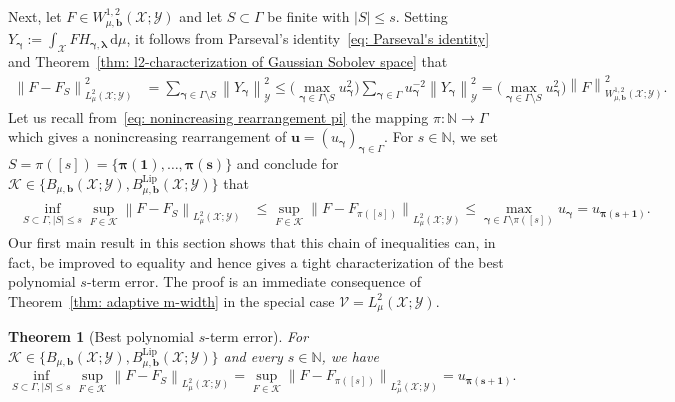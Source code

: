 \documentclass[namedate,webpdf]{ima-authoring-template-blank}
\newcommand*{\Lip}{\mathrm{Lip}}  %
\def\D{\,\mathrm{d}}
\newcommand*{\nm}[1]{{\left\|#1\right \|}}
\newcommand*{\nmd}[1]{{\|#1\|}}    %
\newcommand{\abs}[1]{\left|#1\right|}
\newcounter{counter}
\numberwithin{counter}{section}
\numberwithin{equation}{section}
\theoremstyle{plain}
\newtheorem{theorem}[counter]{Theorem}
\theoremstyle{definition}
\newcommand*{\cK}{\mathcal{K}}
\newcommand*{\cV}{\mathcal{V}}
\newcommand*{\cX}{\mathcal{X}}
\newcommand*{\cY}{\mathcal{Y}}
\newcommand*{\bbN}{\mathbb{N}}
\theoremstyle{thmstyletwo}
\begin{document}
Next, let \(F \in W_{\mu, \bm{b}}^{1, 2}(\cX; \cY)\) and let \(S \subset \Gamma\) be finite with \(\abs{S} \leq s\). Setting \(Y_{\bm{\gamma}} := \int_{\cX} F H_{\bm{\gamma}, \bm{\lambda}} \D \mu\), it follows from Parseval's identity~\eqref{eq: Parseval's identity} and Theorem~\ref{thm: l2-characterization of Gaussian Sobolev space} that
\begin{align*}
    \nm{F - F_S}_{L_{\mu}^2(\cX; \cY)}^2 
    &= \sum_{\bm{\gamma} \in \Gamma \setminus S} \nm{Y_{\bm{\gamma}}}_{\cY}^2 
    \leq \big( \max_{\bm{\gamma} \in \Gamma \setminus S} u_{\bm{\gamma}}^2 \big) \sum_{\bm{\gamma} \in \Gamma} u_{\bm{\gamma}}^{-2} \nm{Y_{\bm{\gamma}}}_{\cY}^2  
    = \big( \max_{\bm{\gamma} \in \Gamma \setminus S} u_{\bm{\gamma}}^2 \big) \nm{F}_{W_{\mu, \bm{b}}^{1, 2}(\cX; \cY)}^2.
\end{align*}
Let us recall from~\eqref{eq: nonincreasing rearrangement pi} the mapping \(\pi: \bbN \to \Gamma\) which gives a nonincreasing rearrangement of \(\bm{u} = (u_{\bm{\gamma}})_{\bm{\gamma} \in \Gamma}\). For $s \in \bbN$, we set \(S = \pi([s]) = \{\bm{\pi(1)}, \dots, \bm{\pi(s)}\}\) and conclude for \(\cK \in \{ B_{\mu, \bm{b}}(\cX; \cY), B_{\mu, \bm{b}}^{\Lip}(\cX; \cY) \}\) that
\begin{align}
\label{eq: s-term: approximation error <= u_pi(s+1)}
\begin{split}
    \inf_{S \subset \Gamma, \abs{S} \leq s} \sup_{F \in \cK} \nm{F - F_S}_{L_{\mu}^2(\cX; \cY)}
    &\leq \sup_{F \in \cK} \nmd{F - F_{\pi([s])}}_{L_{\mu}^2(\cX; \cY)} 
    \leq \max_{\bm{\gamma} \in \Gamma \setminus \pi([s])} u_{\bm{\gamma}} 
    = u_{\bm{\pi(s + 1)}}.
\end{split}
\end{align}
Our first main result in this section shows that this chain of inequalities can, in fact, be improved to equality and hence gives a tight characterization of the best polynomial \(s\)-term error.
The proof is an immediate consequence of Theorem~\ref{thm: adaptive m-width} in the special case \(\cV = L_{\mu}^2(\cX; \cY)\).

\begin{theorem}[Best polynomial \(s\)-term error]
\label{thm: s-term: best s-term approximation error}
    For \(\cK \in \{ B_{\mu, \bm{b}}(\cX; \cY), B_{\mu, \bm{b}}^{\Lip}(\cX; \cY) \}\) and every \(s \in \bbN\), we have
    \[
    \inf_{S \subset \Gamma, \abs{S} \leq s} \sup_{F \in \cK} 
    \nm{F - F_S}_{L_{\mu}^2(\cX; \cY)} 
    = \sup_{F \in \cK} \nmd{F - F_{\pi([s])}}_{L_{\mu}^2(\cX; \cY)} 
    = u_{\bm{\pi(s + 1)}}.
    \]
\end{theorem}
\end{document}
